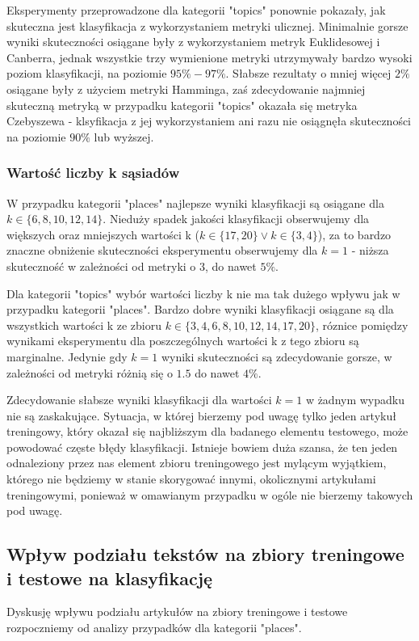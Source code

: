 \documentclass{classrep}
\begin{document}
Eksperymenty przeprowadzone dla kategorii "topics" ponownie pokazały, jak skuteczna jest klasyfikacja z wykorzystaniem metryki ulicznej. Minimalnie gorsze wyniki skuteczności osiągane były z wykorzystaniem metryk Euklidesowej i Canberra, jednak wszystkie trzy wymienione metryki utrzymywały bardzo wysoki poziom klasyfikacji, na poziomie $95\%-97\%$. Słabsze rezultaty o mniej więcej $2\%$ osiągane były z użyciem metryki Hamminga, zaś zdecydowanie najmniej skuteczną metryką w przypadku kategorii "topics" okazała się metryka Czebyszewa - klsyfikacja z jej wykorzystaniem ani razu nie osiągnęła skuteczności na poziomie $90\%$ lub wyższej. \newline

\subsubsection{Wartość liczby k sąsiadów}
W przypadku kategorii "places" najlepsze wyniki klasyfikacji są osiągane dla $k \in \{6, 8, 10, 12, 14\}$. Nieduży spadek jakości klasyfikacji obserwujemy dla większych oraz mniejszych wartości k ($k\in \{17, 20\} \lor k \in \{3, 4\}$), za to bardzo znaczne obniżenie skuteczności eksperymentu obserwujemy dla $k=1$ - niższa skuteczność w zależności od metryki o 3, do nawet $5\%$. \newline

Dla kategorii "topics" wybór wartości liczby k nie ma tak dużego wpływu jak w przypadku kategorii "places". Bardzo dobre wyniki klasyfikacji osiągane są dla wszystkich wartości k ze zbioru $k \in \{3, 4, 6, 8, 10, 12, 14, 17, 20\}$, róznice pomiędzy wynikami eksperymentu dla poszczególnych wartości k z tego zbioru są marginalne. Jedynie gdy $k=1$ wyniki skuteczności są zdecydowanie gorsze, w zależności od metryki różnią się o $1.5$ do nawet $4\%$. \newline

Zdecydowanie słabsze wyniki klasyfikacji dla wartości $k=1$ w żadnym wypadku nie są zaskakujące. Sytuacja, w której bierzemy pod uwagę tylko jeden artykuł treningowy, który okazał się najbliższym dla badanego elementu testowego, może powodować częste błędy klasyfikacji. Istnieje bowiem duża szansa, że ten jeden odnaleziony przez nas element zbioru treningowego jest mylącym wyjątkiem, którego nie będziemy w stanie skorygować innymi, okolicznymi artykułami treningowymi, ponieważ w omawianym przypadku w ogóle nie bierzemy takowych pod uwagę.

\subsection{Wpływ podziału tekstów na zbiory treningowe i testowe na klasyfikację}
Dyskusję wpływu podziału artykułów na zbiory treningowe i testowe rozpoczniemy od analizy przypadków dla kategorii "places".  \newline
\end{document}
